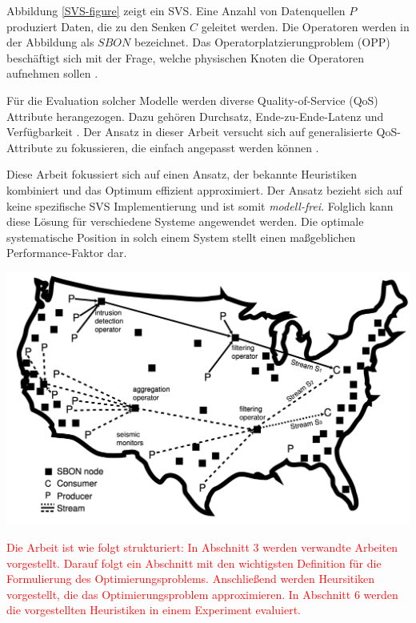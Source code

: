 \documentclass{article}
\begin{document}
Abbildung \ref{SVS-figure} zeigt ein SVS. Eine Anzahl von Datenquellen $P$ produziert Daten, die zu den Senken $C$ geleitet werden. Die Operatoren 
werden in der Abbildung als $SBON$ bezeichnet. Das Operatorplatzierungproblem (OPP) beschäftigt sich mit der Frage, 
welche physischen Knoten die Operatoren aufnehmen sollen \cite{network-aware-op}. 

Für die Evaluation solcher Modelle werden diverse Quality-of-Service (QoS) Attribute herangezogen. 
Dazu gehören Durchsatz, Ende-zu-Ende-Latenz und Verfügbarkeit \cite{efficient-operator-placement,cardellini-optimal_operatorplc}.
 Der Ansatz in dieser Arbeit versucht sich auf generalisierte QoS-Attribute 
zu fokussieren, die einfach angepasst werden können \cite{efficient-operator-placement}.

Diese Arbeit fokussiert sich auf einen Ansatz, der bekannte Heuristiken kombiniert und das Optimum effizient approximiert. 
Der Ansatz bezieht sich auf keine spezifische SVS Implementierung und ist somit \textit{modell-frei}. Folglich kann diese Lösung für verschiedene Systeme angewendet werden.
Die optimale systematische Position in solch einem System stellt einen maßgeblichen Performance-Faktor dar. 


\begin{center}
    \includegraphics[width=0.5\linewidth]{res/SVS.png}
    \label{SVS-figure}
\end{center}

\textcolor{red}{Die Arbeit ist wie folgt strukturiert: In Abschnitt 3 werden verwandte Arbeiten vorgestellt. 
Darauf folgt ein Abschnitt mit den wichtigsten Definition für die Formulierung des Optimierungsproblems. Anschließend werden Heursitiken vorgestellt, die das Optimierungsproblem approximieren.  
In Abschnitt 6 werden die vorgestellten Heuristiken in einem Experiment evaluiert.}
\end{document}
